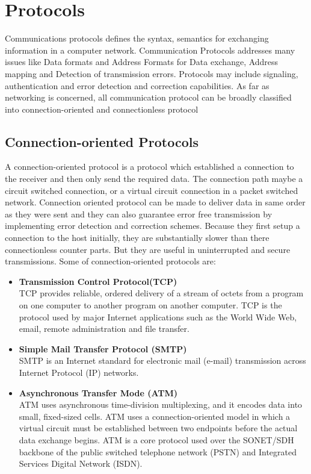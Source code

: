 \section{Protocols}
Communications protocols defines the syntax, semantics for exchanging information in a computer network. Communication Protocols addresses many issues like Data formats and Address Formats for Data exchange, Address mapping and Detection of transmission errors.
Protocols may include signaling, authentication and error detection and correction capabilities.
As far as networking is concerned, all communication protocol can be broadly classified into connection-oriented and connectionless protocol

\subsection{Connection-oriented Protocols}
A connection-oriented protocol is a protocol which established a connection to the receiver and then only send the required data.
The connection path maybe a circuit switched connection, or a virtual circuit connection in a packet switched network.
Connection oriented protocol can be made to deliver data in same order as they were sent and they can also guarantee error free transmission by implementing error detection and correction schemes.
Because they first setup a connection to the host initially, they are substantially slower than there connectionless counter parts.
But they are useful in uninterrupted and secure transmissions.
Some of connection-oriented protocols are:
\begin{itemize}
	\item \textbf{Transmission Control Protocol(TCP)}\\
	TCP provides reliable, ordered delivery of a stream of octets from a program on one computer to another program on another computer. TCP is the protocol used by major Internet applications such as the World Wide Web, email, remote administration and file transfer.
	\item \textbf{Simple Mail Transfer Protocol (SMTP)}\\
	SMTP is an Internet standard for electronic mail (e-mail) transmission across Internet Protocol (IP) networks.
	\item \textbf{Asynchronous Transfer Mode (ATM)}\\
	ATM uses asynchronous time-division multiplexing, and it encodes data into small, fixed-sized cells.
	ATM uses a connection-oriented model in which a virtual circuit must be established between two endpoints before the actual data exchange begins.
	ATM is a core protocol used over the SONET/SDH backbone of the public switched telephone network (PSTN) and Integrated Services Digital Network (ISDN).
\end{itemize}

